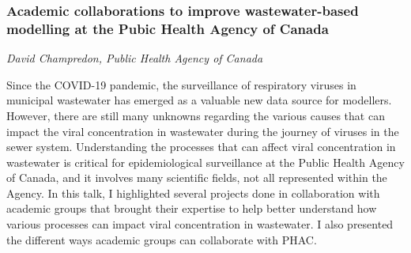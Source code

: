 \subsubsection*{Academic collaborations to improve wastewater-based modelling at the Pubic Health Agency of Canada}
\textit{David Champredon, Public Health Agency of Canada}

Since the COVID-19 pandemic, the surveillance of respiratory viruses in municipal wastewater has emerged as a valuable new data source for modellers.
However, there are still many unknowns regarding the various causes that can impact the viral concentration in wastewater during the journey of viruses in the sewer system.
Understanding the processes that can affect viral concentration in wastewater is critical for epidemiological surveillance at the Public Health Agency of Canada, and it involves many scientific fields, not all represented within the Agency.
In this talk, I highlighted several projects done in collaboration with academic groups that brought their expertise to help better understand how various processes can impact viral concentration in wastewater. I also presented the different ways academic groups can collaborate with PHAC.




























